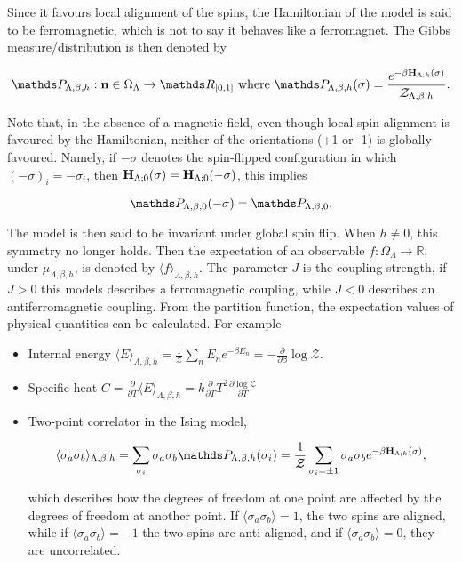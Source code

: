 \documentclass{homework}
\begin{document}
Since it favours local alignment of the spins, the Hamiltonian of the model is said to be ferromagnetic, which is not to say it behaves like a ferromagnet. The Gibbs measure/distribution is then denoted by 

\begin{equation}
    \begin{split}
        \prob_{\Lambda, \beta, h} :{\bf n} \in \Omega_{\Lambda}\rightarrow \R_{[0,1]} \textnormal{ where }
         \prob_{\Lambda, \beta, h}(\sigma) = \frac{e^{-\beta {\bf H}_{\Lambda; h}(\sigma) }}{\mathcal{Z}_{\Lambda, \beta, h}}. 
    \end{split}
\end{equation}

Note that, in the absence of a magnetic field, even though local spin alignment is favoured by the Hamiltonian, neither of the orientations (+1 or -1) is globally favoured. Namely, if $-\sigma$ denotes the spin-flipped configuration in which $(-\sigma)_{i} = -\sigma_i$, then ${\bf H}_{\Lambda; 0}(\sigma) = {\bf H}_{\Lambda; 0}(-\sigma)$, this implies 

$$
    \prob_{\Lambda, \beta, 0} (-\sigma) = \prob_{\Lambda, \beta, 0}. 
$$

The model is then said to be invariant under global spin flip. When $h\neq0$, this symmetry no longer holds. Then the expectation of an observable $f : \Omega_\Lambda \rightarrow \mathds{R}$, under $\mu_{\Lambda, \beta, h}$, is denoted by $\langle f \rangle_{\Lambda, \beta, h}$. 
The parameter $J$ is the coupling strength, if $J>0$ this models describes a ferromagnetic coupling, while $J<0$ describes an antiferromagnetic coupling. 
From the partition function, the expectation values of physical quantities can be calculated. For example

\begin{itemize}
    \item Internal energy $\langle E\rangle_{\Lambda, \beta, h} = \frac{1}{\mathcal{Z}} \sum_{n} E_n e^{-\beta E_n} = - \frac{\partial}{\partial \beta} \log \mathcal{Z}$. \\
    \item Specific heat $C = \frac{\partial}{\partial T} \langle E\rangle_{\Lambda, \beta, h} = k \frac{\partial}{\partial T} T^2 \frac{\partial \log \mathcal{Z}}{\partial T}$ \\
    \item Two-point correlator in the Ising model, 
    
    $$
    \langle \sigma_a \sigma_b \rangle_{\Lambda, \beta, h} = \sum_{\sigma_i} \sigma_a \sigma_b \prob_{\Lambda, \beta, h}({\sigma_i}) = \frac{1}{\mathcal{Z}} \sum_{\sigma_i = \pm 1} \sigma_a \sigma_b e^{-\beta {\bf H}_{\Lambda; h}(\sigma)},
    $$
    
    which describes how the degrees of freedom at one point are affected by the degrees of freedom at another point. If $ \langle \sigma_a \sigma_b \rangle = 1$, the two spins are aligned, while if $ \langle \sigma_a \sigma_b \rangle = -1$ the two spins are anti-aligned, and if $ \langle \sigma_a \sigma_b \rangle = 0$, they are uncorrelated. 
\end{itemize}
\end{document}
